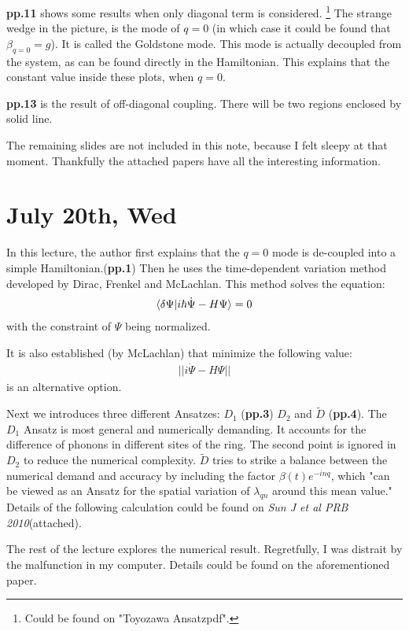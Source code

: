 \documentclass{article}
\numberwithin{equation}{subsection} %
\theoremstyle{definition}
\begin{document}
\textbf{pp.11} shows some results when only diagonal term
is considered.
\footnote{Could be found on "Toyozawa Ansatzpdf".}
The strange wedge
in the picture, is the mode of $q=0$ 
(in which case it could be found that $\beta_{q=0} = g$). 
It is
called the Goldstone mode. This mode is actually decoupled from 
the system, as can be found directly in the Hamiltonian. This explains
that the constant value inside these plots, when $q=0$.

\textbf{pp.13} is the result of off-diagonal coupling. 
There will be two regions enclosed by solid line.

The remaining slides are not included in this note,
because I felt sleepy at that moment. Thankfully the
attached papers have all the interesting information.
\section{July 20th, Wed}
\label{sec:July_20th_Wed}
In this lecture, the author first explains that the $q=0$ mode is
de-coupled into a simple Hamiltonian.(\textbf{pp.1})
Then he uses the time-dependent
variation method developed by Dirac, Frenkel and McLachlan. This method
solves the equation:
\begin{align}
    \label{eq:}
    \braket{\delta \Psi| i\hbar \dot{\Psi} - H\Psi} = 0
\end{align}
with the constraint of $\Psi$ being normalized.

It is also established (by McLachlan) that minimize the following
value:
\begin{align}
    \label{eq:July_20th_Wed}
    ||i\dot{\Psi}-H\Psi||
\end{align}
is an alternative option.

Next we introduces three different Ansatzes: $D_1$ (\textbf{pp.3})
$D_2$ and $\widetilde{D}$ (\textbf{pp.4}). The $D_1$ Ansatz is most
general and numerically demanding. It accounts for the difference 
of phonons in different sites of the ring. The second point is ignored
in $D_2$ to reduce the numerical complexity. $\widetilde{D}$ tries to
strike a balance between the numerical demand and accuracy by including
the factor $\beta(t)e^{-inq}$, which "can be viewed as an Ansatz for 
the spatial variation of $\lambda_{qn}$ around this mean value."
Details of the following calculation could be found on 
\textit{Sun J et al PRB 2010}(attached).

The rest of the lecture explores the numerical result. Regretfully, I
was distrait by the malfunction in my computer. Details could be found
on the aforementioned paper.
\end{document}
